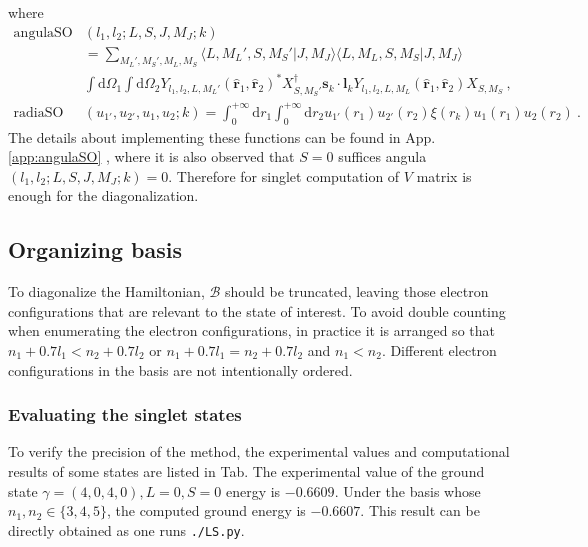 \documentclass{article}
\renewcommand{\d}{\mathrm{d}}
\begin{document}
where
\begin{align}
\text{angulaSO}&(l_1,l_2;L,S,J,M_J;k) \nonumber\\
&= \sum_{M_L',M_S',M_L,M_S}\langle L,M_L',S,M_S'|J,M_J\rangle\langle L,M_L,S,M_S|J,M_J\rangle\nonumber\\
&\int\d\Omega_1\int\d\Omega_2 Y_{l_1,l_2,L,M_L'}(\bm{\hat r}_1,\bm{\hat r}_2)^*X_{S,M_S'}^\dagger\bm{s}_k\cdot\bm{l}_kY_{l_1,l_2,L,M_L}(\bm{\hat r}_1,\bm{\hat r}_2)X_{S,M_S}~,\\
\text{radiaSO}&(u_{1'},u_{2'},u_{1},u_{2};k) = \int_{0}^{+\infty}\d r_1\int_{0}^{+\infty}\d r_2 u_{1'}(r_1)u_{2'}(r_2)\xi(r_k)u_{1}(r_1)u_{2}(r_2)~.
\end{align}
The details about implementing these functions can be found in App. \ref{app:angulaSO} , where it is also observed that $S=0$ suffices angula$(l_1,l_2;L,S,J,M_J;k) =0$. Therefore for singlet computation of $V$ matrix is enough for the diagonalization.

\subsection{Organizing basis}
To diagonalize the Hamiltonian, $\mathcal B$ should be truncated, leaving those electron configurations that are relevant to the state of interest.
To avoid double counting when enumerating the electron configurations, in practice it is arranged so that $n_1+0.7l_1 < n_2+0.7l_2$ or $n_1+0.7l_1 = n_2+0.7l_2$ and $n_1<n_2$. 
Different electron configurations in the basis are not intentionally ordered.


\subsubsection{Evaluating the singlet states}
To verify the precision of the method, the experimental values and computational results of some states are listed in Tab. 
The experimental value of the ground state $\gamma=(4,0,4,0),L=0,S=0$ energy is $-0.6609$. Under the basis whose $n_1,n_2\in \{3,4,5\}$, the computed ground energy is $-0.6607$.
This result can be directly obtained as one runs \texttt{./LS.py}. 
\end{document}
